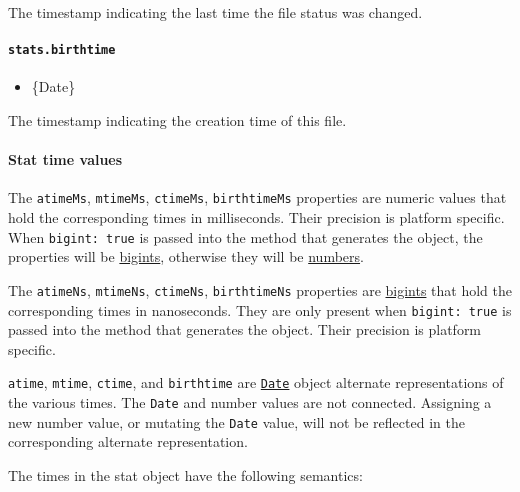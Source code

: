 The timestamp indicating the last time the file status was changed.

\paragraph{\texorpdfstring{\texttt{stats.birthtime}}{stats.birthtime}}\label{stats.birthtime}

\begin{itemize}
\tightlist
\item
  \{Date\}
\end{itemize}

The timestamp indicating the creation time of this file.

\paragraph{Stat time values}\label{stat-time-values}

The \texttt{atimeMs}, \texttt{mtimeMs}, \texttt{ctimeMs},
\texttt{birthtimeMs} properties are numeric values that hold the
corresponding times in milliseconds. Their precision is platform
specific. When \texttt{bigint:\ true} is passed into the method that
generates the object, the properties will be
\href{https://tc39.github.io/proposal-bigint}{bigints}, otherwise they
will be
\href{https://developer.mozilla.org/en-US/docs/Web/JavaScript/Data_structures\#Number_type}{numbers}.

The \texttt{atimeNs}, \texttt{mtimeNs}, \texttt{ctimeNs},
\texttt{birthtimeNs} properties are
\href{https://tc39.github.io/proposal-bigint}{bigints} that hold the
corresponding times in nanoseconds. They are only present when
\texttt{bigint:\ true} is passed into the method that generates the
object. Their precision is platform specific.

\texttt{atime}, \texttt{mtime}, \texttt{ctime}, and \texttt{birthtime}
are
\href{https://developer.mozilla.org/en-US/docs/Web/JavaScript/Reference/Global_Objects/Date}{\texttt{Date}}
object alternate representations of the various times. The \texttt{Date}
and number values are not connected. Assigning a new number value, or
mutating the \texttt{Date} value, will not be reflected in the
corresponding alternate representation.

The times in the stat object have the following semantics:

